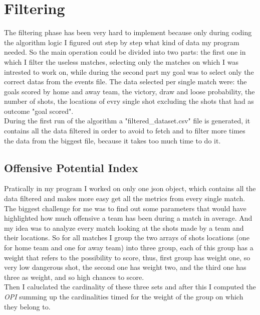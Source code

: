 \documentclass[a4paper,titlepage,11pt]{report}
\begin{document}
{\section{
Filtering}
The filtering phase has been very hard to implement because only during coding the algorithm logic I figured out step by step what kind of data my program needed. So the main operation could be divided into two parts: the first one in which I filter the useless matches, selecting only the matches on which I was intrested to work on, while during the second part my goal was to select only the correct datas from the events file. The data selected per single match were: the goals scored by home and away team, the victory, draw and loose probability, the number of shots, the locations of evry single shot excluding the shots that had as outcome "goal scored".\\
During the first run of the algorithm a "filtered\_dataset.csv" file is generated, it contains all the data filtered in order to avoid to fetch and to filter more times the data from the biggest file, because it takes too much time to do it. 

\subsection{
Offensive Potential Index}
Pratically in my program I worked on only one json object, which contains all the data filtered and makes more easy get all the metrics from every single match. The biggest challenge for me was to find out some parameters that would have highlighted how much offensive a team has been during a match in average. And my idea was to analyze every match looking at the shots made by a team and their locations. So for all matches I group the two arrays of shots locations (one for home team and one for away team) into three group, each of this group has a weight that refers to the possibility to score, thus, first group has weight one, so very low dangerous shot, the second one has weight two, and the third one has three as weight, and so high chances to score.\\
Then I caluclated the cardinality of these three sets and after this I computed the \textit{OPI} summing up the cardinalities timed for the weight of the group on which they belong to.


}
\end{document}
